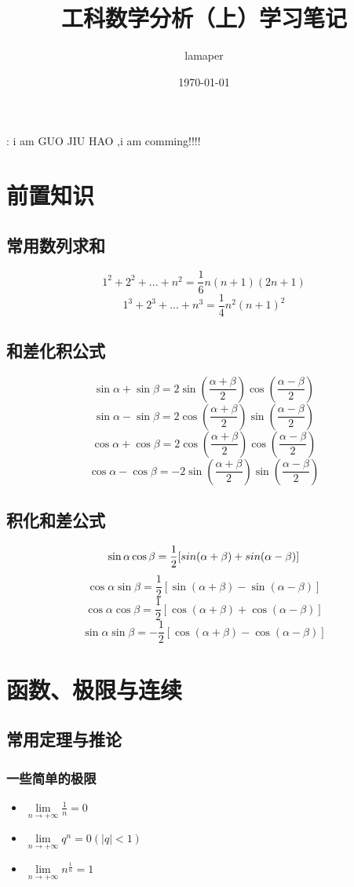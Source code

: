 \documentclass[12pt , a4paper , oneside]{ctexart}
\title{工科数学分析（上）学习笔记}
\author{lamaper}
\date{\today}
\begin{document}
     : i am GUO JIU HAO ,i am comming!!!!

    
    \section{前置知识}
        \subsection{常用数列求和}
        $$1^2 + 2^2 + ...+n^2 = \frac{1}{6}n(n+1)(2n+1)$$
        $$1^3 + 2^3 + ...+n^3 = \frac{1}{4}n^2(n+1)^2$$  

        \subsection{和差化积公式}
        $$\sin \alpha + \sin \beta = 2\sin (\frac{\alpha + \beta}{2})\cos (\frac{\alpha - \beta}{2})$$
        $$\sin \alpha - \sin \beta = 2\cos (\frac{\alpha + \beta}{2})\sin (\frac{\alpha - \beta}{2})$$
        $$\cos \alpha + \cos \beta = 2\cos (\frac{\alpha + \beta}{2})\cos (\frac{\alpha - \beta}{2})$$
        $$\cos \alpha - \cos \beta = -2\sin (\frac{\alpha + \beta}{2})\sin (\frac{\alpha - \beta}{2})$$

        \subsection{积化和差公式}
        $$\sin \alpha \cos \beta = \frac{1}{2}[\\sin (\alpha + \beta) + \\sin (\alpha - \beta)]$$
        $$\cos \alpha \sin \beta = \frac{1}{2}[\sin (\alpha + \beta) - \sin (\alpha - \beta)]$$
        $$\cos \alpha \cos \beta = \frac{1}{2}[\cos (\alpha + \beta) + \cos (\alpha - \beta)]$$
        $$\sin \alpha \sin \beta = -\frac{1}{2}[\cos (\alpha + \beta) - \cos (\alpha - \beta)]$$

    \section{函数、极限与连续}
        \subsection{常用定理与推论}
            \subsubsection{一些简单的极限}
                \begin{itemize}
                \item $\lim\limits_{n \to +\infty} \frac{1}{n} = 0$
                \item $\lim\limits_{n \to +\infty} q^n = 0 (|q| < 1)$
                \item $\lim\limits_{n \to +\infty} n^\frac{1}{n} = 1$
                \end{itemize}
\end{document}
